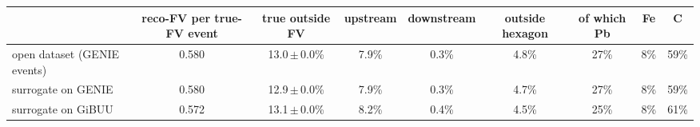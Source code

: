 \begin{tabular}{lcccccccc}
\toprule
 & reco-FV per true-FV event & true outside FV & upstream & downstream & outside hexagon & of which Pb & Fe & C \\
\midrule
open dataset (GENIE events) & 0.580 & 13.0\,$\pm$\,0.0\% & 7.9\% & 0.3\% & 4.8\% & 27\% & 8\% & 59\% \\
surrogate on GENIE & 0.580 & 12.9\,$\pm$\,0.0\% & 7.9\% & 0.3\% & 4.7\% & 27\% & 8\% & 59\% \\
surrogate on GiBUU & 0.572 & 13.1\,$\pm$\,0.0\% & 8.2\% & 0.4\% & 4.5\% & 25\% & 8\% & 61\% \\
\bottomrule
\end{tabular}

